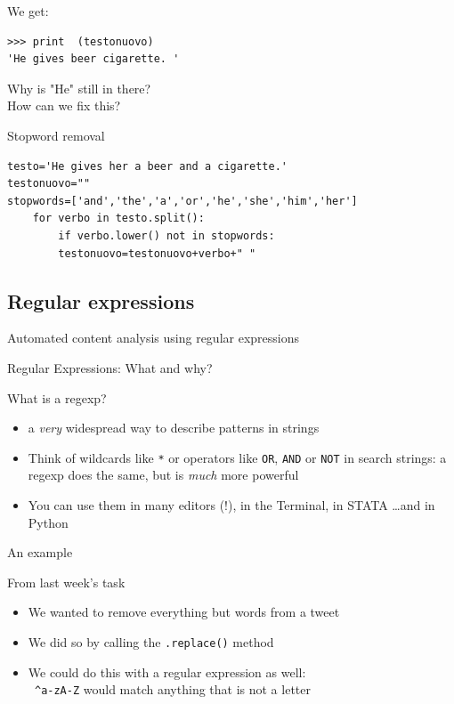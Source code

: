 \documentclass{beamer}
\begin{document}
\begin{frame}[fragile]{We get:}
\begin{lstlisting}
>>> print  (testonuovo)
'He gives beer cigarette. '
\end{lstlisting}
Why is "He" still in there? \\ How can we fix this?
\end{frame}

\begin{frame}[fragile]{Stopword removal}
\begin{lstlisting}
testo='He gives her a beer and a cigarette.'
testonuovo=""
stopwords=['and','the','a','or','he','she','him','her']
    for verbo in testo.split():
        if verbo.lower() not in stopwords:
        testonuovo=testonuovo+verbo+" "
\end{lstlisting}
\end{frame}










\subsection{Regular expressions}

\begin{frame}
Automated content analysis using regular expressions
\end{frame}

\begin{frame}{Regular Expressions: What and why?}
\begin{block}{What is a regexp?}
\begin{itemize}
\item<1-> a \emph{very} widespread way to describe patterns in strings
\item<2-> Think of wildcards like {\tt{*}} or operators like {\tt{OR}}, {\tt{AND}} or {\tt{NOT}} in search strings: a regexp does the same, but is \emph{much} more powerful
\item<3-> You can use them in many editors (!), in the Terminal, in STATA \ldots and in Python
\end{itemize}
\end{block}
\end{frame}

\begin{frame}{An example}
\begin{block}{From last week's task}
\begin{itemize}
\item We wanted to remove everything but words from a tweet
\item We did so by calling the \texttt{.replace()} method
\item We could do this with a regular expression as well: \\
{\tt{ \lbrack \^{}a-zA-Z\rbrack}} would match anything that is not a letter
\end{itemize}
\end{block}
\end{frame}
\end{document}
